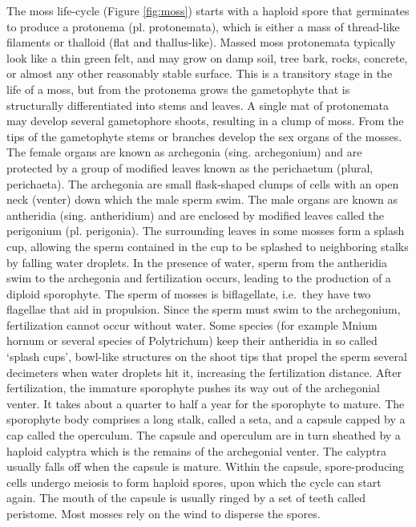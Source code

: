 \documentclass[]{book}
\theoremstyle{definition}
\theoremstyle{definition}
\theoremstyle{definition}
\theoremstyle{remark}
\begin{document}
The moss life-cycle (Figure \ref{fig:moss}) starts with a haploid spore
that germinates to produce a protonema (pl. protonemata), which is
either a mass of thread-like filaments or thalloid (flat and
thallus-like). Massed moss protonemata typically look like a thin green
felt, and may grow on damp soil, tree bark, rocks, concrete, or almost
any other reasonably stable surface. This is a transitory stage in the
life of a moss, but from the protonema grows the gametophyte that is
structurally differentiated into stems and leaves. A single mat of
protonemata may develop several gametophore shoots, resulting in a clump
of moss. From the tips of the gametophyte stems or branches develop the
sex organs of the mosses. The female organs are known as archegonia
(sing. archegonium) and are protected by a group of modified leaves
known as the perichaetum (plural, perichaeta). The archegonia are small
flask-shaped clumps of cells with an open neck (venter) down which the
male sperm swim. The male organs are known as antheridia (sing.
antheridium) and are enclosed by modified leaves called the perigonium
(pl. perigonia). The surrounding leaves in some mosses form a splash
cup, allowing the sperm contained in the cup to be splashed to
neighboring stalks by falling water droplets. In the presence of water,
sperm from the antheridia swim to the archegonia and fertilization
occurs, leading to the production of a diploid sporophyte. The sperm of
mosses is biflagellate, i.e.~they have two flagellae that aid in
propulsion. Since the sperm must swim to the archegonium, fertilization
cannot occur without water. Some species (for example Mnium hornum or
several species of Polytrichum) keep their antheridia in so called
`splash cups', bowl-like structures on the shoot tips that propel the
sperm several decimeters when water droplets hit it, increasing the
fertilization distance. After fertilization, the immature sporophyte
pushes its way out of the archegonial venter. It takes about a quarter
to half a year for the sporophyte to mature. The sporophyte body
comprises a long stalk, called a seta, and a capsule capped by a cap
called the operculum. The capsule and operculum are in turn sheathed by
a haploid calyptra which is the remains of the archegonial venter. The
calyptra usually falls off when the capsule is mature. Within the
capsule, spore-producing cells undergo meiosis to form haploid spores,
upon which the cycle can start again. The mouth of the capsule is
usually ringed by a set of teeth called peristome. Most mosses rely on
the wind to disperse the spores.
\end{document}
